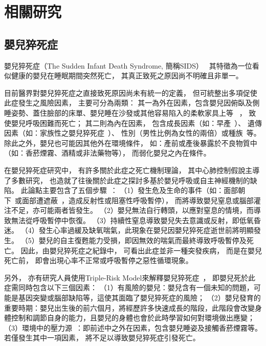 \documentclass[class=NCU_thesis, crop=false]{standalone}
\begin{document}
\chapter{相關研究}

\section{嬰兒猝死症}
嬰兒猝死症（The Sudden Infant Death Syndrome, 簡稱SIDS）~\cite{kinney_sudden_2009}
其特徵為一位看似健康的嬰兒在睡眠期間突然死亡，
其真正致死之原因尚不明確且非單一。

目前醫界對嬰兒猝死症之直接致死原因尚未有統一的定義，
但可統整出多項促使此症發生之風險因素，
主要可分為兩類：
其一為外在因素，包含嬰兒因俯臥及側睡姿勢、蓋住臉部的床單、嬰兒睡在沙發或其他容易陷入的柔軟家具上等
~\cite{willinger_infant_1994, mitchell_reduction_1994, iyasu_risk_2002, kemp_unsafe_2000, ponsonby_factors_1993}，
致使嬰兒呼吸困難而死亡；
其二則為內在因素，
包含成長因素（如：早產~\cite{horne_effects_2006}）、
遺傳因素（如：家族性之嬰兒猝死症~\cite{ce_sudden_2001, oyen_population-based_1996}）、
性別（男性比例為女性的兩倍）或種族~\cite{hauck_sleep_2003}等。
除此之外，嬰兒也可能因其他外在環境條件，
如：產前或產後暴露於不良物質中（如：香菸煙霧、酒精或非法藥物等），
而弱化嬰兒之內在條件。

在嬰兒猝死症研究中，
有許多關於此症之死亡機制理論，
其中心肺控制假說主導了多數研究，
也造就了往後關於此症之探討多基於嬰兒呼吸或自主神經機制的缺陷。
此論點主要包含了五個步驟~\cite{kinney_sudden_2009}：
（1）發生危及生命的事件（如：面部朝下~\cite{kemp_sudden_1991}或面部遭遮蔽~\cite{skadberg_consequences_1997}，造成反射性或阻塞性呼吸暫停），
而將導致嬰兒窒息或腦部灌注不足，亦可能兩者皆發生。
（2）嬰兒無法自行轉頭，以應對窒息的情境，而導致無法從呼吸暫停中恢復。
（3）持續性窒息導致嬰兒失去意識或反射，即低氧昏迷。
（4）發生心率過緩及缺氧喘氣，此現象在嬰兒因嬰兒猝死症逝世前將明顯發生。
（5）嬰兒的自主復甦能力受損，即因無效的喘氣而最終導致呼吸暫停及死亡。
因此，由嬰兒猝死症之紀錄中，
可看出此症並非一種突發疾病，
而是在嬰兒死亡前，
即會出現心率不正常或呼吸暫停之惡性循環現象。

另外，
亦有研究人員使用Triple-Risk Model來解釋嬰兒猝死症~\cite{noauthor_what_nodate}，
即嬰兒死於此症需同時包含以下三個因素：
（1）有風險的嬰兒：嬰兒含有一個未知的問題，可能是基因突變或腦部缺陷等，這使其面臨了嬰兒猝死症的風險；
（2）嬰兒發育的重要時期：嬰兒出生後的前六個月，將經歷許多快速成長的階段，此階段會改變身體控制和調節自身的能力，且嬰兒的身體也會於此時學習如何對環境做出應變；
（3）環境中的壓力源~\cite{moon_sids_2011}：即前述中之外在因素，包含嬰兒睡姿及接觸香菸煙霧等。
若僅發生其中一項因素，
將不足以導致嬰兒猝死症引發死亡。
\end{document}
